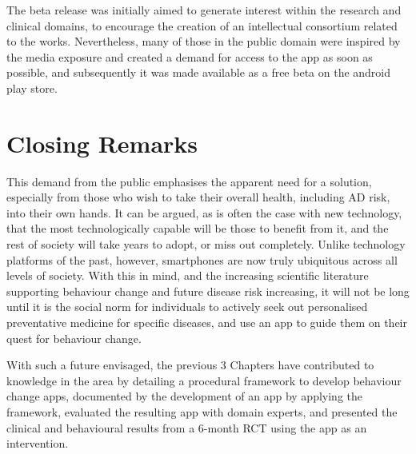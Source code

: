 The beta release was initially aimed to generate interest within the research and clinical domains, to encourage the creation of an intellectual consortium related to the works. Nevertheless, many of those in the public domain were inspired by the media exposure and created a demand for access to the app as soon as possible, and subsequently it was made available as a free beta on the android play store.

\section{Closing Remarks}
This demand from the public emphasises the apparent need for a solution, especially from those who wish to take their overall health, including AD risk, into their own hands. It can be argued, as is often the case with new technology, that the most technologically capable will be those to benefit from it, and the rest of society will take years to adopt, or miss out completely. Unlike technology platforms of the past, however, smartphones are now truly ubiquitous across all levels of society. With this in mind, and the increasing scientific literature supporting behaviour change and future disease risk increasing, it will not be long until it is the social norm for individuals to actively seek out personalised preventative medicine for specific diseases, and use an app to guide them on their quest for behaviour change.

With such a future envisaged, the previous 3 Chapters have contributed to knowledge in the area by detailing a procedural framework to develop behaviour change apps, documented by the development of an app by applying the framework, evaluated the resulting app with domain experts, and presented the clinical and behavioural results from a 6-month RCT using the app as an  intervention.
